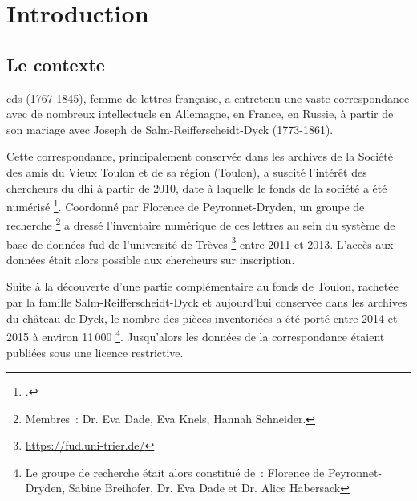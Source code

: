 \documentclass[a4paper,12pt,twoside]{book}
\begin{document}
	\mainmatter
	
	\pagestyle{plain}
	\chapter*{Introduction}
	
		\section*{Le contexte}
			\gls{cds} (1767-1845), femme de lettres française, a entretenu une vaste correspondance avec de nombreux intellectuels en Allemagne, en France, en Russie, à partir de son mariage avec Joseph de Salm-Reifferscheidt-Dyck (1773-1861).
			
			Cette correspondance, principalement conservée dans les archives de la Société des amis du Vieux Toulon et de sa région (Toulon), a suscité l'intérêt des chercheurs du \gls{dhi} à partir de 2010, date à laquelle le fonds de la société a été numérisé
			\footcite{peyronnet-drydenSalonVirtuelInventaire2012, ProposProjet}. Coordonné par Florence de Peyronnet-Dryden, un groupe de recherche%
			\footnote{Membres~: Dr. Eva Dade, Eva Knels, Hannah Schneider.} %
			a dressé l'inventaire numérique de ces lettres au sein du système de base de données \gls{fud} de l’université de Trèves
			\footnote{\url{https://fud.uni-trier.de/}} %
			entre 2011 et 2013. L'accès aux données était alors possible aux chercheurs sur inscription.%
			
			Suite à la découverte d'une partie complémentaire au fonds de Toulon, rachetée par la famille Salm-Reifferscheidt-Dyck et aujourd'hui conservée dans les archives du château de Dyck, le nombre des pièces inventoriées a été porté entre 2014 et 2015 à environ 11\,000%
			\footnote{Le groupe de recherche était alors constitué de~: Florence de Peyronnet-Dryden, Sabine Breihofer, Dr. Eva Dade et Dr. Alice Habersack}.
			Jusqu'alors les données de la correspondance étaient publiées sous une licence restrictive.
			
\end{document}
